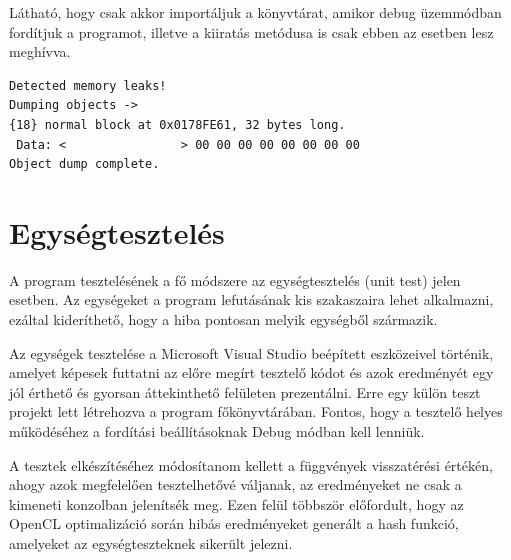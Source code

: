 Látható, hogy csak akkor importáljuk a könyvtárat, amikor debug üzemmódban fordítjuk a programot, illetve a kiiratás metódusa is csak ebben az esetben lesz meghívva.

\begin{lstlisting}
Detected memory leaks!
Dumping objects ->
{18} normal block at 0x0178FE61, 32 bytes long.
 Data: <                > 00 00 00 00 00 00 00 00
Object dump complete.
\end{lstlisting}






\section{Egységtesztelés}

A program tesztelésének a fő módszere az egységtesztelés (unit test) jelen esetben. Az egységeket a program lefutásának kis szakaszaira lehet alkalmazni, ezáltal kideríthető, hogy a hiba pontosan melyik egységből származik.

Az egységek tesztelése a Microsoft Visual Studio beépített eszközeivel történik, amelyet képesek futtatni az előre megírt tesztelő kódot és azok eredményét egy jól érthető és gyorsan áttekinthető felületen prezentálni. Erre egy külön teszt projekt lett létrehozva a program főkönyvtárában. Fontos, hogy a tesztelő helyes működéséhez a fordítási beállításoknak Debug módban kell lenniük.

A tesztek elkészítéséhez módosítanom kellett a függvények visszatérési értékén, ahogy azok megfelelően tesztelhetővé váljanak, az eredményeket ne csak a kimeneti konzolban jelenítsék meg. Ezen felül többször előfordult, hogy az OpenCL optimalizáció során hibás eredményeket generált a hash funkció, amelyeket az egységteszteknek sikerült jelezni.

